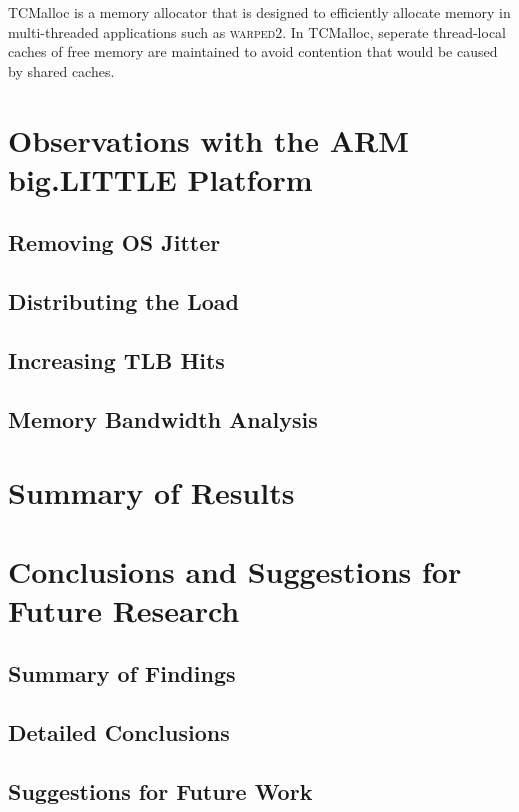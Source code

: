 \documentclass[11pt]{book}
\begin{document}
TCMalloc is a memory allocator that is designed to efficiently allocate memory in
multi-threaded applications such as \textsc{warped2}. In TCMalloc, seperate thread-local
caches of free memory are maintained to avoid contention that would be caused by shared
caches.


\chapter{Observations with the ARM big.LITTLE Platform}\label{big_little_platform}

\section{Removing OS Jitter}

\section{Distributing the Load}

\section{Increasing TLB Hits}

\section{Memory Bandwidth Analysis}

\chapter{Summary of Results}\label{results_summary}


\chapter[Conclusions \& Future Research]{Conclusions and Suggestions for Future Research}
\label{conclude}

\section{Summary of Findings}



\section{Detailed Conclusions}

\section{Suggestions for Future Work}




 \markright{ }
\end{document}

